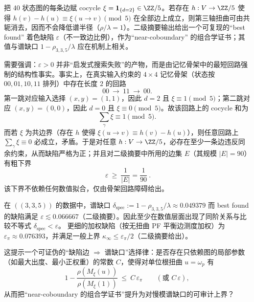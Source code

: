 \begin{remark}\label{rem:arity-335-best-5-coloring}
把 40 状态图的每条边赋 cocycle $\xi=\mathbf{1}_{\{d=2\}}\in\ZZ/5$。若存在 $h:V\to\ZZ/5$ 使得 $h(v)-h(u)\equiv \xi(u\to v)\pmod 5$ 在全部边上成立，则第三轴扭曲可由共轭消去，因而不会降低谱半径（$\rho/\lambda=1$）。二级摘要输出给出一个可复现的“best found” 着色缺陷 $\varepsilon$（不一致边比例），作为“near-coboundary” 的组合学证书；其值与谱缺口 $1-\rho_{3,3,5}/\lambda$ 应在机制上相关。
\par
需要强调：\(\varepsilon>0\) 并非“启发式搜索失败”的产物，而是由记忆骨架中的最短回路强制的结构性事实。事实上，在真实输入约束的 $4\times 4$ 记忆骨架（状态按 $00,01,10,11$ 排列）中存在长度 \(2\) 的回路
\[
00\ \longrightarrow\ 11\ \longrightarrow\ 00.
\]
第一跳对应输入选择 \((x,y)=(1,1)\)，因此 \(d=2\) 且 \(\xi\equiv 1\pmod 5\)；第二跳对应 \((x,y)=(0,0)\)，因此 \(d=0\) 且 \(\xi\equiv 0\pmod 5\)。故该回路上的 cocycle 和为
\[
\sum_{\gamma}\xi\equiv 1\pmod 5.
\]
而若 \(\xi\) 为共边界（存在 \(h\) 使得 \(\xi(u\to v)\equiv h(v)-h(u)\)），则任意回路上 \(\sum_\gamma \xi\equiv 0\) 必成立，矛盾。于是对任意 \(h:V\to\ZZ/5\)，必存在至少一条边违反同余约束，从而缺陷严格为正；并且对二级摘要中所用的边集 \(E\)（其规模 \(|E|=90\)）有粗下界
\[
\boxed{\ \varepsilon\ \ge\ \frac{1}{|E|}=\frac{1}{90}\ }.
\]
该下界不依赖任何数值拟合，仅由骨架回路障碍给出。
\par
在 \(((3,3,5))\) 的数据中，谱缺口
\(
\delta_{\mathrm{spec}}:=1-\rho_{3,3,5}/\lambda\approx 0.049379
\)
而 best found 的缺陷满足 \(\varepsilon\lesssim 0.066667\)（二级摘要）。因此至少在数值层面出现了同阶关系与比较不等式 \(\delta_{\mathrm{spec}}<\varepsilon\)。
更细的加权缺陷（按无扭曲 PF 平衡边测度加权）为 \(\varepsilon_\pi\approx 0.076393\)，并满足一般上界 \(\kappa_\infty\le \varepsilon_\pi/2\)（二级摘要给出）。
\par
这提示一个可证伪的“缺陷边 \(\Rightarrow\) 谱缺口”选择律：是否存在只依赖图的局部参数（如最大出度、最小正权重）的常数 \(C\)，使得对单位根扭曲 \(u=\omega_p\) 有
\[
1-\frac{\rho(M_\xi(u))}{\rho(M_\xi(1))}\ \le\ C\,\varepsilon_\pi \qquad(\text{或 } C\,\varepsilon),
\]
从而把“near-coboundary 的组合学证书”提升为对慢模谱缺口的可审计上界？
\end{remark}

